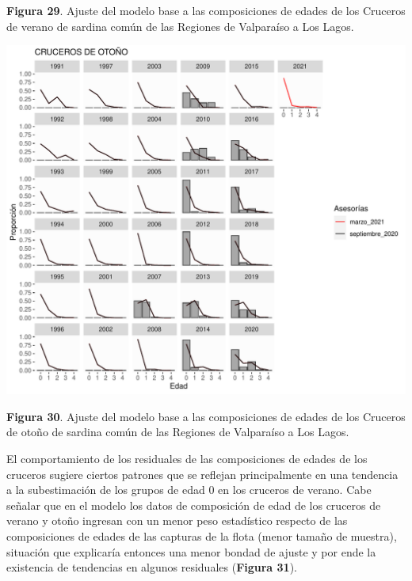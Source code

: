 \documentclass[
  spanish,
]{article}
\begin{document}
\vspace{-0.5cm}
\small

\textbf{Figura 29}. Ajuste del modelo base a las composiciones de edades
de los Cruceros de verano de sardina común de las Regiones de Valparaíso
a Los Lagos. \vspace{0.3cm} \normalsize

\begin{center}\includegraphics{FigurasInforme_Marzo/Fig30_ajustesCompP-1} \end{center}

\vspace{-0.5cm}
\small

\textbf{Figura 30}. Ajuste del modelo base a las composiciones de edades
de los Cruceros de otoño de sardina común de las Regiones de Valparaíso
a Los Lagos. \vspace{0.3cm} \normalsize

\pagebreak

El comportamiento de los residuales de las composiciones de edades de
los cruceros sugiere ciertos patrones que se reflejan principalmente en
una tendencia a la subestimación de los grupos de edad 0 en los cruceros
de verano. Cabe señalar que en el modelo los datos de composición de
edad de los cruceros de verano y otoño ingresan con un menor peso
estadístico respecto de las composiciones de edades de las capturas de
la flota (menor tamaño de muestra), situación que explicaría entonces
una menor bondad de ajuste y por ende la existencia de tendencias en
algunos residuales (\textbf{Figura 31}).
\end{document}
